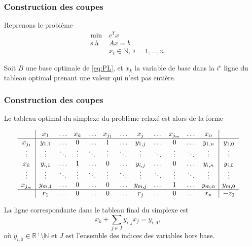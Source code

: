 \documentclass[usepdftitle=false]{beamer}
\begin{document}
\begin{frame}
\frametitle{Construction des coupes}

Reprenons le problème
\begin{equation}
	\begin{aligned}
		\min\ & c^Tx \\
		\mbox{s.à } & Ax = b \\
		& x_i \in \mathbb{N},\ i = 1,\ldots,n.
	\end{aligned}
	\tag{P}
\end{equation}

\mbox{}

Soit $B$ une base optimale de \eqref{eq:PL}, et $x_k$ la variable de base dans la $i^e$ ligne du tableau optimal prenant une valeur qui n'est pas entière.

\end{frame}

\begin{frame}
\frametitle{Construction des coupes}

Le tableau optimal du simplexe du problème relaxé est alors de la forme
\begin{footnotesize}
$$
\begin{array}{c|ccccccccccc|c}
& x_1 & \ldots & x_k & \ldots & x_{j_1}& \ldots & x_j & \ldots & x_{j_m} & \ldots & x_n & \\
\hline
x_{j_1}& y_{1,1} & \ldots & 0 & \ldots & 1 & \ldots & y_{1,j} & \ldots & 0 & \ldots & y_{1,n} & y_{1,0} \\
\vdots & \vdots & \ddots & \vdots & \ddots & \vdots & \ddots & \vdots & \ddots & \vdots & \ddots & \vdots & \vdots \\
x_k & y_{i,1} & \ldots & 1 & \ldots & 0 & \ldots & y_{i,j} & \ldots & 0 & \ldots & y_{i,n} & y_{i,0} \\
\vdots & \vdots & \ddots & \vdots & \ddots & \vdots & \ddots & \vdots & \ddots & \vdots & \ddots & \vdots & \vdots \\
x_{j_m} & y_{m,1} & \ldots & 0 & \ldots & 0 & \ldots & y_{m,j} & \ldots & 1 & \ldots & y_{m,n} & y_{m,0} \\
\hline
& r_1 & \ldots & 0 & \ldots & 0 & \ldots & r_j & \ldots & 0 & \ldots & r_n & -z_0
\end{array}
$$
\end{footnotesize}

La ligne correspondante dans le tableau final du simplexe est
$$
x_k + \sum_{j \in J} y_{i,j}x_j = y_{i,0},
$$
où $y_{i,0} \in \mathbb{R}^+ \setminus \mathbb{N}$ et $J$ est l'ensemble des indices des variables hors base.

\end{frame}
\end{document}
